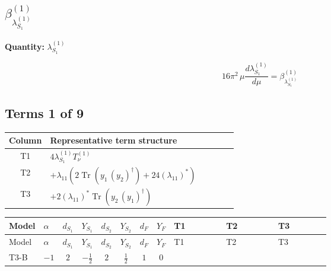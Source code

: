 \documentclass[8pt]{article}
\begin{document}
\begin{landscape}
\section*{$\beta_{\lambda_{S_1}^{(1)}}^{(1)}$}
\noindent\textbf{Quantity: }$\lambda_{S_1}^{(1)}$\par\smallskip
\[16\pi^2\,\mu\frac{d \lambda_{S_1}^{(1)}}{d\mu}=\beta_{\lambda_{S_1}^{(1)}}^{(1)}\]
\subsection*{Terms 1 of 9}
\begin{center}
\begin{tabular}{@{}c >{\raggedright\arraybackslash}p{0.82\linewidth}@{}}
\toprule
Column & Representative term structure \\
\midrule
T1 & \(\displaystyle 4 {\lambda_{S_1}^{(1)}} T_{\nu}^{(1)}\) \\
\midrule
T2 & \(\displaystyle +{\lambda_{11}} (2 \operatorname{Tr}\!\left({y_1}\,\left({y_2}\right)^{\dagger}\right)+24 \left({\lambda_{11}}\right)^{*})\) \\
\midrule
T3 & \(\displaystyle +2 \left({\lambda_{11}}\right)^{*} \operatorname{Tr}\!\left({y_2}\,\left({y_1}\right)^{\dagger}\right)\) \\
\midrule
\bottomrule
\end{tabular}
\end{center}
\smallskip
\tiny
\begin{longtable}{@{}llcccccc >{\raggedright\arraybackslash}p{0.21\linewidth} >{\raggedright\arraybackslash}p{0.21\linewidth} >{\raggedright\arraybackslash}p{0.21\linewidth}@{}}
\toprule
Model & $\alpha$ & $d_{S_1}$ & $Y_{S_1}$ & $d_{S_2}$ & $Y_{S_2}$ & $d_F$ & $Y_F$ & T1 & T2 & T3 \\
\midrule
\endfirsthead
\toprule
Model & $\alpha$ & $d_{S_1}$ & $Y_{S_1}$ & $d_{S_2}$ & $Y_{S_2}$ & $d_F$ & $Y_F$ & T1 & T2 & T3 \\
\midrule
\endhead
T3-B & $-1$ & $2$ & $-\frac{1}{2}$ & $2$ & $\frac{1}{2}$ & $1$ & $0$ & \scriptsize\adjustbox{max width=\linewidth}{$\begin{gathered} 4 {\lambda_{S_1}^{(1)}} T_{\nu}^{(1)}\end{gathered}$} & \scriptsize\adjustbox{max width=\linewidth}{$\begin{gathered} +{\lambda_{11}} (2 \operatorname{Tr}\!\left({y_1}\,\left({y_2}\right)^{\dagger}\right)+24 \left({\lambda_{11}}\right)^{*})\end{gathered}$} & \scriptsize\adjustbox{max width=\linewidth}{$\begin{gathered} +2 \left({\lambda_{11}}\right)^{*} \operatorname{Tr}\!\left({y_2}\,\left({y_1}\right)^{\dagger}\right)\end{gathered}$} \\

\end{longtable}
\end{landscape}
\end{document}
